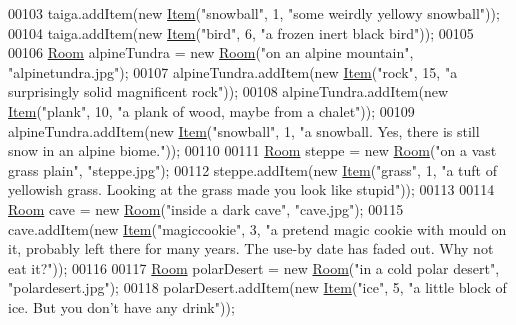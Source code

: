 \begin{DoxyCode}
00103         taiga.addItem(\textcolor{keyword}{new} \hyperlink{classpkg__world_1_1Item}{Item}(\textcolor{stringliteral}{"snowball"}, 1, \textcolor{stringliteral}{"some weirdly yellowy snowball"}));
00104         taiga.addItem(\textcolor{keyword}{new} \hyperlink{classpkg__world_1_1Item}{Item}(\textcolor{stringliteral}{"bird"}, 6, \textcolor{stringliteral}{"a frozen inert black bird"}));
00105 
00106         \hyperlink{classpkg__world_1_1Room}{Room} alpineTundra = \textcolor{keyword}{new} \hyperlink{classpkg__world_1_1Room}{Room}(\textcolor{stringliteral}{"on an alpine mountain"}, \textcolor{stringliteral}{"alpinetundra.jpg"});
00107         alpineTundra.addItem(\textcolor{keyword}{new} \hyperlink{classpkg__world_1_1Item}{Item}(\textcolor{stringliteral}{"rock"}, 15, \textcolor{stringliteral}{"a surprisingly solid magnificent rock"}));
00108         alpineTundra.addItem(\textcolor{keyword}{new} \hyperlink{classpkg__world_1_1Item}{Item}(\textcolor{stringliteral}{"plank"}, 10, \textcolor{stringliteral}{"a plank of wood, maybe from a chalet"}));
00109         alpineTundra.addItem(\textcolor{keyword}{new} \hyperlink{classpkg__world_1_1Item}{Item}(\textcolor{stringliteral}{"snowball"}, 1, \textcolor{stringliteral}{"a snowball. Yes, there is still snow in an alpine
       biome."}));
00110 
00111         \hyperlink{classpkg__world_1_1Room}{Room} steppe = \textcolor{keyword}{new} \hyperlink{classpkg__world_1_1Room}{Room}(\textcolor{stringliteral}{"on a vast grass plain"}, \textcolor{stringliteral}{"steppe.jpg"});
00112         steppe.addItem(\textcolor{keyword}{new} \hyperlink{classpkg__world_1_1Item}{Item}(\textcolor{stringliteral}{"grass"}, 1, \textcolor{stringliteral}{"a tuft of yellowish grass. Looking at the grass made you
       look like stupid"}));
00113 
00114         \hyperlink{classpkg__world_1_1Room}{Room} cave = \textcolor{keyword}{new} \hyperlink{classpkg__world_1_1Room}{Room}(\textcolor{stringliteral}{"inside a dark cave"}, \textcolor{stringliteral}{"cave.jpg"});
00115         cave.addItem(\textcolor{keyword}{new} \hyperlink{classpkg__world_1_1Item}{Item}(\textcolor{stringliteral}{"magiccookie"}, 3, \textcolor{stringliteral}{"a pretend magic cookie with mould on it, probably left
       there for many years. The use-by date has faded out. Why not eat it?"}));
00116 
00117         \hyperlink{classpkg__world_1_1Room}{Room} polarDesert = \textcolor{keyword}{new} \hyperlink{classpkg__world_1_1Room}{Room}(\textcolor{stringliteral}{"in a cold polar desert"}, \textcolor{stringliteral}{"polardesert.jpg"});
00118         polarDesert.addItem(\textcolor{keyword}{new} \hyperlink{classpkg__world_1_1Item}{Item}(\textcolor{stringliteral}{"ice"}, 5, \textcolor{stringliteral}{"a little block of ice. But you don't have any drink"}));

\end{DoxyCode}
